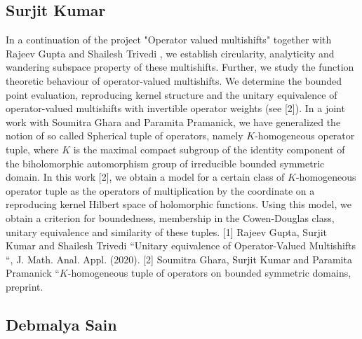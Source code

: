 \subsection{Surjit Kumar}

In a continuation of the project "Operator valued multishifts" together with Rajeev Gupta and Shailesh Trivedi , we establish circularity, analyticity and wandering subspace property of these multishifts. Further, we study the function theoretic behaviour of operator-valued multishifts. We determine the bounded point evaluation, reproducing kernel structure and the unitary equivalence of operator-valued multishifts with invertible operator weights (see [2]).   In a joint work with Soumitra Ghara and Paramita Pramanick, we have generalized the notion of so called Spherical tuple of operators, namely $K$-homogeneous operator tuple, where $K$ is the maximal compact subgroup of the identity component of the biholomorphic automorphism group of irreducible bounded symmetric domain. In this work [2], we obtain a model for a certain class of $K$-homogeneous operator tuple as the operators of multiplication by the coordinate on a reproducing kernel Hilbert space of holomorphic functions. Using this model, we obtain a criterion for boundedness, membership in the Cowen-Douglas class, unitary equivalence and similarity of these tuples.  [1] Rajeev Gupta, Surjit Kumar and Shailesh Trivedi “Unitary equivalence of Operator-Valued Multishifts “, J. Math. Anal. Appl. (2020). [2] Soumitra Ghara, Surjit Kumar and Paramita Pramanick “$K$-homogeneous tuple of operators on bounded symmetric domains, preprint. 


\subsection{Debmalya Sain}

